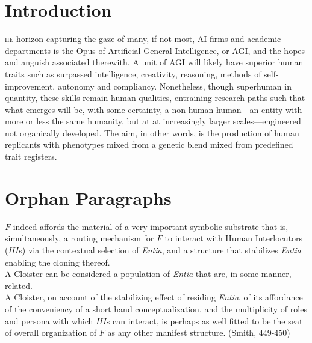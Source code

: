 

\section{Introduction}

\lettrine[lines=3]{\junicode{\textcolor{violet}{T}}}{he} horizon capturing the
gaze of many, if not most, AI firms and academic departments is the Opus of
Artificial General Intelligence, or \textsc{AGI}, and the hopes and anguish
associated therewith.  A unit of \textsc{AGI} will likely have superior human
traits such as surpassed intelligence, creativity, reasoning, methods of
self-improvement, autonomy and compliancy. Nonetheless, though superhuman in
quantity, these skills remain human qualities, entraining research paths such
that what emerges will be, with some certainty, a non-human human---an entity
with more or less the same humanity, but at at increasingly larger
scales---engineered not organically developed.  The aim, in other words, is the
production of human replicants with phenotypes mixed from a genetic blend mixed
from predefined trait registers.

\newpage

\section{Orphan Paragraphs}

$F$ indeed affords the material of a very important symbolic substrate that is,
simultaneously, a routing mechanism for $F$ to interact with Human
Interlocutors ($HI$s) via the contextual selection of \textit{Entia}, and a
structure that stabilizes \textit{Entia} enabling the cloning thereof.\\

\noindent A Cloister can be considered a population of \textit{Entia} that are, in some
manner, related.\\

\noindent A Cloister, on account of the stabilizing effect of residing \textit{Entia}, of
its affordance of the conveniency of a short hand conceptualization, and the
multiplicity of roles and persona with which $HI$s can interact, is perhaps as
well fitted to be the seat of overall organization of $F$ as any other manifest
structure. (Smith, 449-450)


